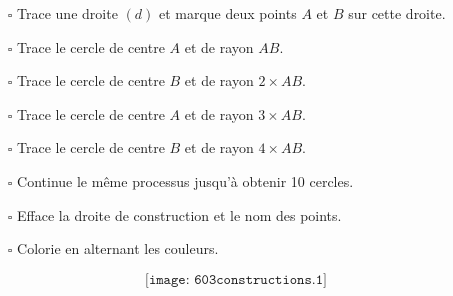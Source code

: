 \begin{cursive}
\begin{itemize}
\item[$\square$] Trace une droite $(d)$ et marque deux points $A$ et $B$ sur cette droite.
\item[$\square$] Trace le cercle de centre $A$ et de rayon $AB$.
\item[$\square$] Trace le cercle de centre $B$ et de rayon $2\times AB$.
\item[$\square$] Trace le cercle de centre $A$ et de rayon $3\times AB$.
\item[$\square$] Trace le cercle de centre $B$ et de rayon $4\times AB$.
\item[$\square$] Continue le même processus jusqu'à obtenir 10 cercles.
\item[$\square$] Efface la droite de construction et le nom des points.
\item[$\square$] Colorie en alternant les couleurs.
\end{itemize}
\end{cursive}
\[\texttt{[image: 603constructions.1]}\]
